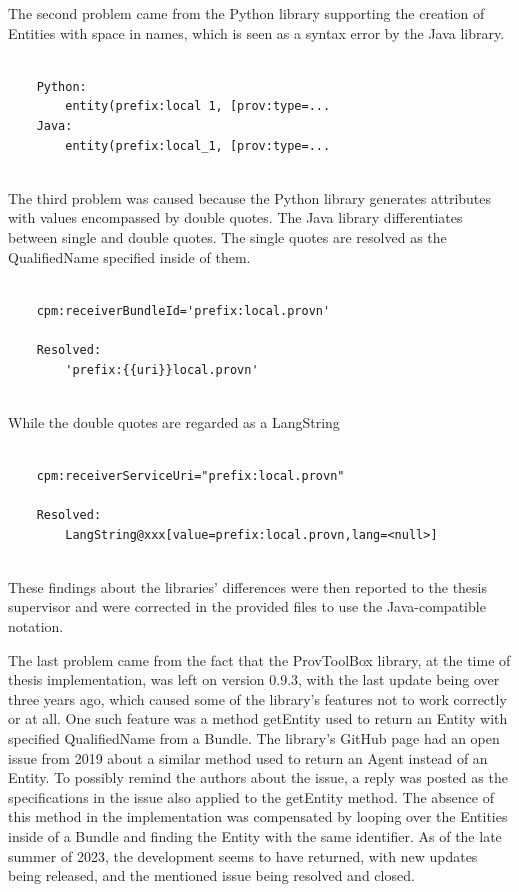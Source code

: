 \documentclass[
  digital,     %
  oneside,     %
  nosansbold,  %
  nocolorbold, %
  lof,         %
  lot,         %
]{fithesis4}
\begin{document}
The second problem came from the Python library supporting the creation of Entities with space in names, which is seen as a syntax error by the Java library.

\begin{verbatim}

    Python:
        entity(prefix:local 1, [prov:type=...
    Java:
        entity(prefix:local_1, [prov:type=... 
        
\end{verbatim}

The third problem was caused because the Python library generates attributes with values encompassed by double quotes. The Java library differentiates between single and double quotes. The single quotes are resolved as the QualifiedName specified inside of them.

\begin{verbatim}

    cpm:receiverBundleId='prefix:local.provn'
    
    Resolved:
        'prefix:{{uri}}local.provn'
        
\end{verbatim}

While the double quotes are regarded as a LangString

\begin{verbatim}

    cpm:receiverServiceUri="prefix:local.provn"
    
    Resolved:
        LangString@xxx[value=prefix:local.provn,lang=<null>]
        
\end{verbatim}

These findings about the libraries' differences were then reported to the thesis supervisor and were corrected in the provided files to use the Java-compatible notation.

The last problem came from the fact that the ProvToolBox library, at the time of thesis implementation, was left on version 0.9.3, with the last update being over three years ago, which caused some of the library's features not to work correctly or at all. One such feature was a method getEntity used to return an Entity with specified QualifiedName from a Bundle. The library's GitHub page had an open issue from 2019 about a similar method used to return an Agent instead of an Entity. To possibly remind the authors about the issue, a reply was posted as the specifications in the issue also applied to the getEntity method. The absence of this method in the implementation was compensated by looping over the Entities inside of a Bundle and finding the Entity with the same identifier. As of the late summer of 2023, the development seems to have returned, with new updates being released, and the mentioned issue being resolved and closed.
\shorthandon{-}
\end{document}
